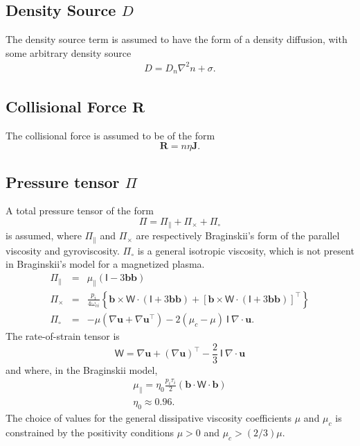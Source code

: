 \documentclass[letterpaper]{book}
\renewcommand{\vec}[1]{\ensuremath{\mathbf{#1}}}
\newcommand{\tensor}[1]{\mathsf{#1}}
\newcommand{\R}{\vec{R}}
\renewcommand{\u}{\vec{u}}
\renewcommand{\j}{\vec{J}}
\renewcommand{\P}{\tensor{\Pi}}
\renewcommand{\b}{\vec{b}}
\newcommand{\W}{\tensor{W}}
\newcommand{\grad}[1]{\nabla #1}
\renewcommand{\div}[1]{\nabla \cdot #1}
\begin{document}
\subsection{Density Source $D$}

The density source term is assumed to have the form of a density
diffusion, with some arbitrary density source
\begin{eqnarray}
  D = D_n \nabla^2 n + \sigma.
\end{eqnarray}


\subsection{Collisional Force $\R$}

The collisional force is assumed to be of the form
\begin{equation}
  \label{eq:collisional_force}
  \R = n \eta \j.
\end{equation}


\subsection{Pressure tensor $\P$ \label{sec:pressure_tensor}}
A total pressure tensor of the form
\begin{equation}
  \P = \P_\parallel + \P_\times + \P_\circ
\end{equation}
is assumed, where $\P_\parallel$ and $\P_\times$ are respectively
Braginskii's form of the parallel viscosity and gyroviscosity.
$\P_\circ$ is a general isotropic viscosity, which is not present in
Braginskii's model for a magnetized plasma.
\begin{eqnarray}
  \label{eq:parallel_viscosity}
  \P_\parallel & = & \mu_\parallel \left( \tensor{I} - 3 \b \b \right)
  \\
  \label{eq:gyroviscosity}
  \P_\times & = & \frac{p_i}{4 \omega_{c i}} \left\{
    \b \times \W \cdot (\tensor{I} + 3 \b\b) +
    \left[\b \times \W \cdot (\tensor{I} + 3 \b\b)\right]^\top
    \right\}
  \\
  \label{eq:general_viscosity}
  \P_\circ & = & -\mu \left(\grad{\u} + \grad{\u}^\top\right)
   -2 \left(\mu_c - \mu \right)\ \tensor{I}\ \div{\u}.
\end{eqnarray}
The rate-of-strain tensor is
\begin{displaymath}
  \W = \nabla \u + (\nabla \u)^\top 
  - \frac{2}{3}\ \tensor{I}\ \div{\u}
\end{displaymath}
and where, in the Braginskii model,
\begin{eqnarray*}
  \mu_\parallel = \eta_0 \frac{p_i \tau_i}{2} 
  \left( \b \cdot \W \cdot \b \right)
  \\
  \eta_0 \approx 0.96.  
\end{eqnarray*}
The choice of values for the general dissipative viscosity
coefficients $\mu$ and $\mu_c$ is constrained by the positivity
conditions $\mu > 0$ and $\mu_c > (2/3)\mu$.
\end{document}
